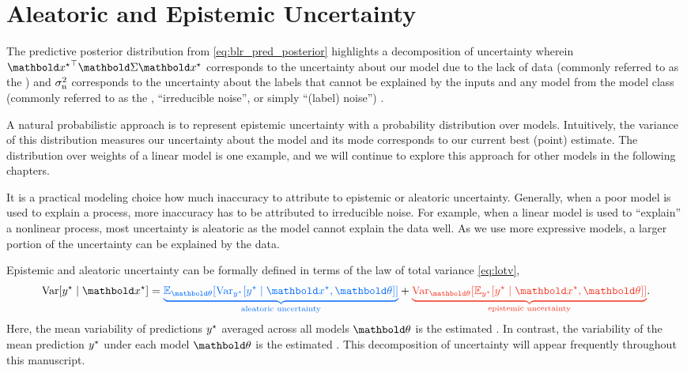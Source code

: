\section{Aleatoric and Epistemic Uncertainty}\label{sec:blr:uncertainty}

The predictive posterior distribution from \cref{eq:blr_pred_posterior} highlights a decomposition of uncertainty wherein $\transpose{\vxs} \mSigma \vxs$ corresponds to the uncertainty about our model due to the lack of data (commonly referred to as the ) and $\sigma_{\mathrm{n}}^2$ corresponds to the uncertainty about the labels that cannot be explained by the inputs and any model from the model class (commonly referred to as the , ``irreducible noise'', or simply ``(label) noise'') .

A natural probabilistic approach is to represent epistemic uncertainty with a probability distribution over models.
Intuitively, the variance of this distribution measures our uncertainty about the model and its mode corresponds to our current best (point) estimate.
The distribution over weights of a linear model is one example, and we will continue to explore this approach for other models in the following chapters.

It is a practical modeling choice how much inaccuracy to attribute to epistemic or aleatoric uncertainty.
Generally, when a poor model is used to explain a process, more inaccuracy has to be attributed to irreducible noise.
For example, when a linear model is used to ``explain'' a nonlinear process, most uncertainty is aleatoric as the model cannot explain the data well.
As we use more expressive models, a larger portion of the uncertainty can be explained by the data.

Epistemic and aleatoric uncertainty can be formally defined in terms of the law of total variance \eqref{eq:lotv}, \begin{align}
  \Var{\ys \mid \vxs} = \b{\underbrace{\E[\vtheta]{\Var[\ys]{\ys \mid \vxs, \vtheta}}}_{\text{aleatoric uncertainty}}} + \r{\underbrace{\Var[\vtheta]{\E[\ys]{\ys \mid \vxs, \vtheta}}}_{\text{epistemic uncertainty}}}. \label{eq:lotv_interpretation}
\end{align}
Here, the mean variability of predictions $y^\star$ averaged across all models $\vtheta$ is the estimated .
In contrast, the variability of the mean prediction $y^\star$ under each model $\vtheta$ is the estimated .
This decomposition of uncertainty will appear frequently throughout this manuscript.

